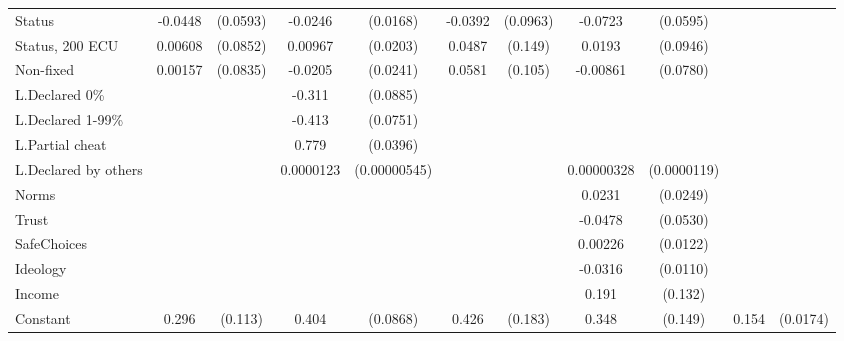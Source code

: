 {\begin{tabular}{l*{5}{cc}}
Status          &  -0.0448         & (0.0593)&  -0.0246         & (0.0168)&  -0.0392         & (0.0963)&  -0.0723         & (0.0595)&                  &         \\
Status, 200 ECU &  0.00608         & (0.0852)&  0.00967         & (0.0203)&   0.0487         &  (0.149)&   0.0193         & (0.0946)&                  &         \\
Non-fixed       &  0.00157         & (0.0835)&  -0.0205         & (0.0241)&   0.0581         &  (0.105)& -0.00861         & (0.0780)&                  &         \\
L.Declared 0\%  &                  &         &   -0.311\sym{***}& (0.0885)&                  &         &                  &         &                  &         \\
L.Declared 1-99\%&                  &         &   -0.413\sym{***}& (0.0751)&                  &         &                  &         &                  &         \\
L.Partial cheat &                  &         &    0.779\sym{***}& (0.0396)&                  &         &                  &         &                  &         \\
L.Declared by others&                  &         &0.0000123\sym{**} &(0.00000545)&                  &         &0.00000328         &(0.0000119)&                  &         \\
Norms           &                  &         &                  &         &                  &         &   0.0231         & (0.0249)&                  &         \\
Trust           &                  &         &                  &         &                  &         &  -0.0478         & (0.0530)&                  &         \\
SafeChoices     &                  &         &                  &         &                  &         &  0.00226         & (0.0122)&                  &         \\
Ideology        &                  &         &                  &         &                  &         &  -0.0316\sym{***}& (0.0110)&                  &         \\
Income          &                  &         &                  &         &                  &         &    0.191         &  (0.132)&                  &         \\
Constant        &    0.296\sym{***}&  (0.113)&    0.404\sym{***}& (0.0868)&    0.426\sym{**} &  (0.183)&    0.348\sym{**} &  (0.149)&    0.154\sym{***}& (0.0174)\\

\end{tabular}}
